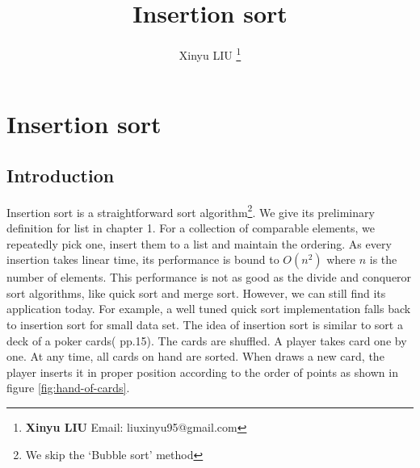 \documentclass[b5paper]{article}
\begin{document}
\title{Insertion sort}

\author{Xinyu LIU
\thanks{{\bfseries Xinyu LIU} \newline
  Email: liuxinyu95@gmail.com \newline}
  }

\maketitle
\fi


\ifx\wholebook\relax
\chapter{Insertion sort}
\fi

\section{Introduction}
\label{sec:isort-introduction} 

\lstset{frame = single}
Insertion sort is a straightforward sort algorithm\footnote{We skip the `Bubble sort' method}. We give its preliminary definition for list in chapter 1. For a collection of comparable elements, we repeatedly pick one, insert them to a list and maintain the ordering. As every insertion takes linear time, its performance is bound to $O(n^2)$ where $n$ is the number of elements. This performance is not as good as the divide and conqueror sort algorithms, like quick sort and merge sort. However, we can still find its application today. For example, a well tuned quick sort implementation falls back to insertion sort for small data set. The idea of insertion sort is similar to sort a deck of a poker cards(\cite{CLRS} pp.15). The cards are shuffled. A player takes card one by one. At any time, all cards on hand are sorted. When draws a new card, the player inserts it in proper position according to the order of points as shown in figure \ref{fig:hand-of-cards}.
\end{document}
